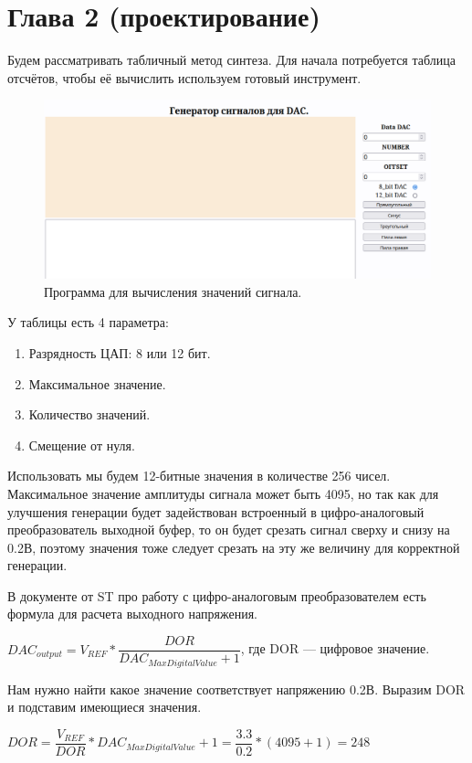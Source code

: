 \chapter{Глава 2 (проектирование)}
Будем рассматривать табличный метод синтеза. Для начала потребуется таблица отсчётов, чтобы её вычислить используем готовый инструмент.
	
	\begin{figure}[H]
    \centering
    \includegraphics[width=1\textwidth]{../image/lut_prog.png}
    \caption{Программа для вычисления значений сигнала.}
	\end{figure}
	
	У таблицы есть 4 параметра:
	\begin{enumerate}
		\item Разрядность ЦАП: 8 или 12 бит.
		\item Максимальное значение.
		\item Количество значений.
		\item Смещение от нуля.
	\end{enumerate}
	
	Использовать мы будем 12-битные значения в количестве 256 чисел. Максимальное значение амплитуды сигнала может быть 4095, но так как для улучшения генерации будет задействован встроенный в цифро-аналоговый преобразователь выходной буфер, то он будет срезать сигнал сверху и снизу на 0.2В, поэтому значения тоже следует срезать на эту же величину для корректной генерации.
	
	В документе от ST про работу с цифро-аналоговым преобразователем есть формула для расчета выходного напряжения.
	
	$DAC_{output} = V_{REF}*\dfrac{DOR}{DAC_{MaxDigitalValue} + 1}$, где DOR --- цифровое значение.
	
	Нам нужно найти какое значение соответствует напряжению 0.2В. Выразим DOR и подставим имеющиеся значения.
	
	$DOR = \dfrac{V_{REF}}{DOR}*DAC_{MaxDigitalValue} + 1 = \dfrac{3.3}{0.2}*(4095+1) = 248$
	
